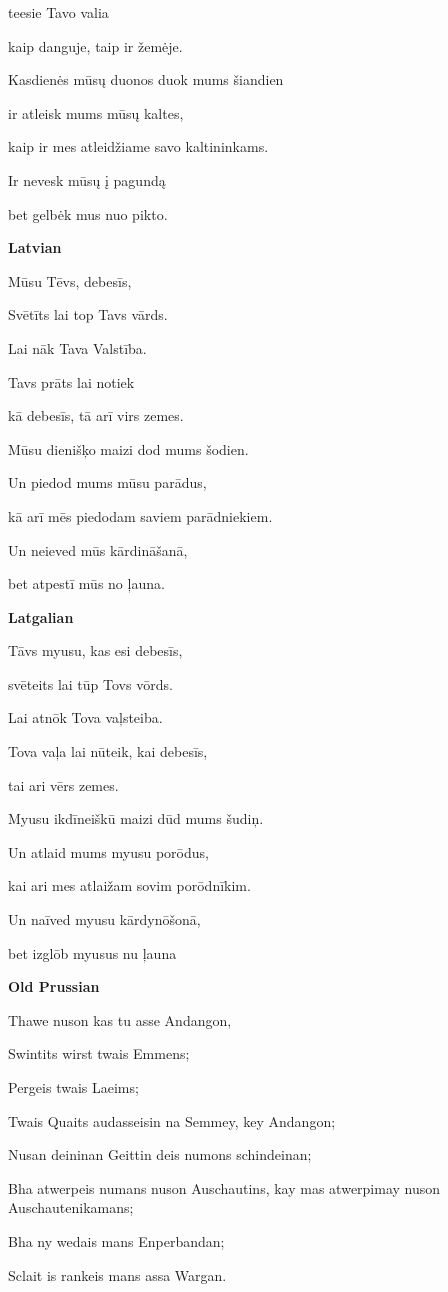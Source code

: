 teesie Tavo valia

kaip danguje, taip ir žemėje.

Kasdienės mūsų duonos duok mums šiandien

ir atleisk mums mūsų kaltes,

kaip ir mes atleidžiame savo kaltininkams.

Ir nevesk mūsų į pagundą

bet gelbėk mus nuo pikto.

\textbf{Latvian}

Mūsu Tēvs, debesīs,

Svētīts lai top Tavs vārds.

Lai nāk Tava Valstība.

Tavs prāts lai notiek

kā debesīs, tā arī virs zemes.

Mūsu dienišķo maizi dod mums šodien.

Un piedod mums mūsu parādus,

kā arī mēs piedodam saviem parādniekiem.

Un neieved mūs kārdināšanā,

bet atpestī mūs no ļauna.

\textbf{Latgalian}

Tāvs myusu, kas esi debesīs,

svēteits lai tūp Tovs vōrds.

Lai atnōk Tova vaļsteiba.

Tova vaļa lai nūteik, kai debesīs,

tai ari vērs zemes.

Myusu ikdīneiškū maizi dūd mums šudiņ.

Un atlaid mums myusu porōdus,

kai ari mes atlaižam sovim porōdnīkim.

Un naīved myusu kārdynōšonā,

bet izglōb myusus nu ļauna

\textbf{Old Prussian}

Thawe nuson kas tu asse Andangon,

Swintits wirst twais Emmens;

Pergeis twais Laeims;

Twais Quaits audasseisin na Semmey, key Andangon;

Nusan deininan Geittin deis numons schindeinan;

Bha atwerpeis numans nuson Auschautins, kay mas atwerpimay nuson Auschautenikamans;

Bha ny wedais mans Enperbandan;

Sclait is rankeis mans assa Wargan.
